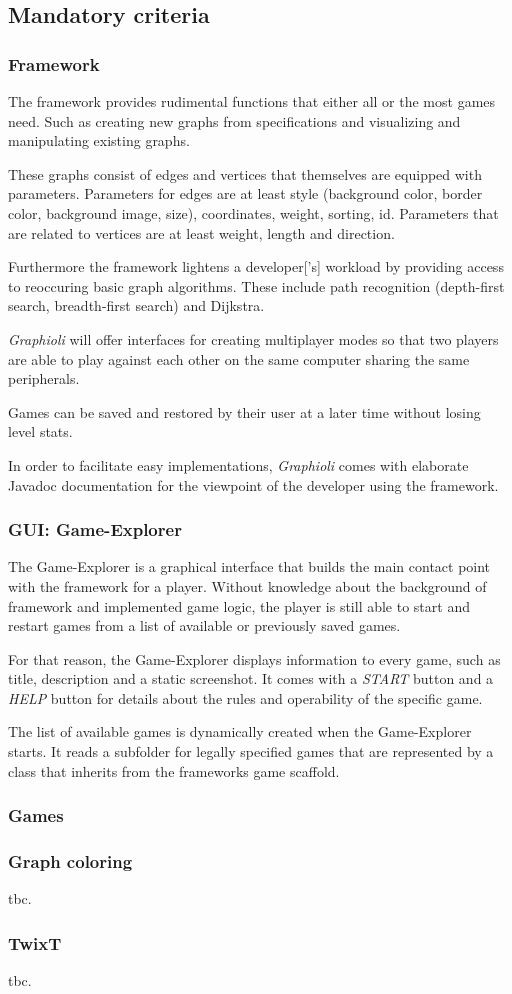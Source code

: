 \subsection{Mandatory criteria}
\subsubsection{Framework}
The framework provides rudimental functions that either all or the most games need. Such as creating new graphs from specifications and visualizing and manipulating existing graphs.\par
These graphs consist of \glspl{edge} and \glspl{vertice} that themselves are equipped with parameters. Parameters for edges are at least style (background color, border color, background image, size), coordinates, weight, sorting, \Gls{id}. Parameters that are related to vertices are at least weight, length and direction.\par
Furthermore the framework lightens a \gls{developer}['s] workload by providing access to reoccuring basic graph algorithms. These include path recognition (depth-first search, breadth-first search) and Dijkstra.\par
\emph{Graphioli} will offer interfaces for creating multiplayer modes so that two \glspl{player} are able to play against each other on the same computer sharing the same peripherals.\par
Games can be saved and restored by their user at a later time without losing \gls{level} stats.\par
In order to facilitate easy implementations, \emph{Graphioli} comes with elaborate \Gls{Javadoc} documentation for the viewpoint of the developer using the framework.\par


\subsubsection{GUI: Game-Explorer}
The Game-Explorer is a graphical interface that builds the main contact point with the framework for a player. Without knowledge about the background of framework and implemented game logic, the player is still able to start and restart games from a list of available or previously saved games.\par
For that reason, the Game-Explorer displays information to every game, such as title, description and a static screenshot. It comes with a \emph{START} button and a \emph{HELP} button for details about the rules and operability of the specific game.\par
The list of available games is dynamically created when the Game-Explorer starts. It reads a subfolder for legally specified games that are represented by a class that inherits from the frameworks game scaffold.

\subsubsection{Games}
\subsubsection{Graph coloring}
tbc.\par

\subsubsection{TwixT}
tbc.\par
